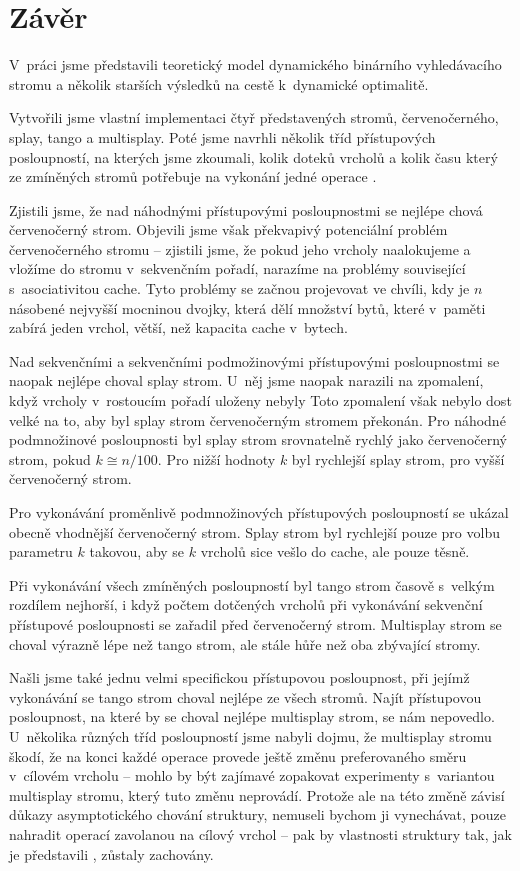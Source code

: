 \chapter*{Závěr}

V~práci jsme představili teoretický model dynamického binárního vyhledávacího stromu a několik starších výsledků na cestě k~dynamické optimalitě.

Vytvořili jsme vlastní implementaci čtyř představených stromů, červenočerného, splay, tango a multisplay. Poté jsme navrhli několik tříd přístupových posloupností, na kterých jsme zkoumali, kolik doteků vrcholů a kolik času který ze zmíněných stromů potřebuje na vykonání jedné operace . 

Zjistili jsme, že nad náhodnými přístupovými posloupnostmi se nejlépe chová červenočerný strom. Objevili jsme však překvapivý potenciální problém červenočerného stromu -- zjistili jsme, že pokud jeho vrcholy naalokujeme a vložíme do stromu v~sekvenčním pořadí, narazíme na problémy související s~asociativitou cache. Tyto problémy se začnou projevovat ve chvíli, kdy je $n$ násobené nejvyšší mocninou dvojky, která dělí množství bytů, které v~paměti zabírá jeden vrchol, větší, než kapacita cache v~bytech.

Nad sekvenčními a sekvenčními podmožinovými přístupovými posloupnostmi se naopak nejlépe choval splay strom. U~něj jsme naopak narazili na zpomalení, když vrcholy v~rostoucím pořadí uloženy nebyly Toto zpomalení však nebylo dost velké na to, aby byl splay strom červenočerným stromem překonán. Pro náhodné podmnožinové posloupnosti byl splay strom srovnatelně rychlý jako červenočerný strom, pokud $k \cong n/100$. Pro nižší hodnoty $k$ byl rychlejší splay strom, pro vyšší červenočerný strom. 

Pro vykonávání proměnlivě podmnožinových přístupových posloupností se ukázal obecně vhodnější červenočerný strom. Splay strom byl rychlejší pouze pro volbu parametru $k$ takovou, aby se $k$ vrcholů sice vešlo do cache, ale pouze těsně.

Při vykonávání všech zmíněných posloupností byl tango strom časově s~velkým
rozdílem nejhorší, i když počtem dotčených vrcholů při vykonávání sekvenční
přístupové posloupnosti se zařadil před červenočerný strom. Multisplay strom se
choval výrazně lépe než tango strom, ale stále hůře než oba zbývající stromy.

Našli jsme také jednu velmi specifickou přístupovou posloupnost, při jejímž vykonávání se tango strom choval nejlépe ze všech stromů. Najít přístupovou posloupnost, na které by se choval nejlépe multisplay strom, se nám nepovedlo. U~několika různých tříd posloupností jsme nabyli dojmu, že multisplay stromu škodí, že na konci každé operace  provede ještě změnu preferovaného směru v~cílovém vrcholu -- mohlo by být zajímavé zopakovat experimenty s~variantou multisplay stromu, který tuto změnu neprovádí. Protože ale na této změně závisí důkazy asymptotického chování struktury, nemuseli bychom ji vynechávat, pouze nahradit operací  zavolanou na cílový vrchol -- pak by vlastnosti struktury tak, jak je  představili \citet{multisplay}, zůstaly zachovány.

